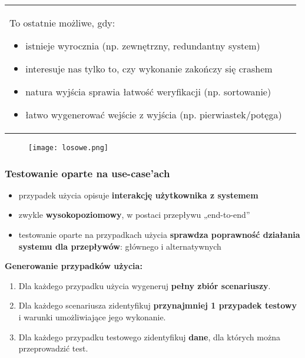 \documentclass[../main.tex]{subfiles}
\begin{document}
\begin{table}[H]
\begin{center}
\begin{tabular}{ p{8cm} | p{8cm}}
                To ostatnie możliwe, gdy:
                \begin{itemize}
                    \item istnieje wyrocznia (np. zewnętrzny, redundantny system)
                    \item interesuje nas tylko to, czy wykonanie zakończy się crashem
                    \item natura wyjścia sprawia łatwość weryfikacji (np. sortowanie)
                    \item łatwo wygenerować wejście z wyjścia (np. pierwiastek/potęga)
                \end{itemize}\\
            \end{tabular}
        \end{center}
    \end{table}



    \begin{figure}[H]
        \texttt{[image: losowe.png]}
    \end{figure}

    \subsubsection{Testowanie oparte na use-case'ach}
    \begin{itemize}
        \item przypadek użycia opisuje \textbf{interakcję użytkownika z systemem}
        \item zwykle \textbf{wysokopoziomowy}, w postaci przepływu „end-to-end”
        \item testowanie oparte na przypadkach użycia \textbf{sprawdza poprawność
        działania systemu dla przepływów}: głównego i alternatywnych
    \end{itemize}

    \textbf{Generowanie przypadków użycia:}
    \begin{enumerate}
        \item Dla każdego przypadku użycia wygeneruj \textbf{pełny zbiór scenariuszy}.
        \item Dla każdego scenariusza zidentyfikuj \textbf{przynajmniej 1 przypadek testowy} i warunki
        umożliwiające jego wykonanie.
        \item Dla każdego przypadku testowego zidentyfikuj \textbf{dane}, dla których można przeprowadzić test.
    \end{enumerate}
\end{document}
